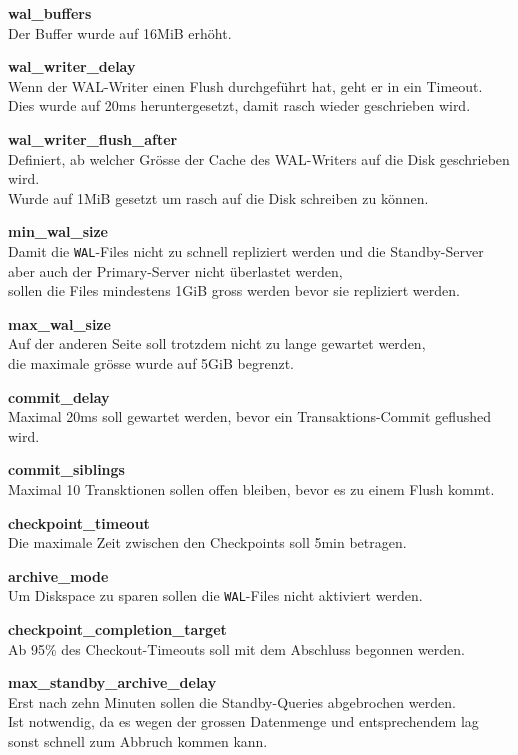 \begin{description}
    \item \textbf{wal\_buffers}\hfill \\Der Buffer wurde auf 16MiB erhöht.
    \item \textbf{wal\_writer\_delay}\hfill \\Wenn der WAL-Writer einen Flush durchgeführt hat, geht er in ein Timeout.\\Dies wurde auf 20ms heruntergesetzt, damit rasch wieder geschrieben wird.
    \item \textbf{wal\_writer\_flush\_after}\hfill \\Definiert, ab welcher Grösse der Cache des WAL-Writers auf die Disk geschrieben wird.\\Wurde auf 1MiB gesetzt um rasch auf die Disk schreiben zu können.
    \item \textbf{min\_wal\_size}\hfill \\Damit die \texttt{WAL}-Files nicht zu schnell repliziert werden und die Standby-Server aber auch der Primary-Server nicht überlastet werden,\\sollen die Files mindestens 1GiB gross werden bevor sie repliziert werden.
    \item \textbf{max\_wal\_size}\hfill \\Auf der anderen Seite soll trotzdem nicht zu lange gewartet werden,\\die maximale grösse wurde auf 5GiB begrenzt.
    \item \textbf{commit\_delay}\hfill \\Maximal 20ms soll gewartet werden, bevor ein Transaktions-Commit geflushed wird.
    \item \textbf{commit\_siblings}\hfill \\Maximal 10 Transktionen sollen offen bleiben, bevor es zu einem Flush kommt.
    \item \textbf{checkpoint\_timeout}\hfill \\Die maximale Zeit zwischen den Checkpoints soll 5min betragen.
    \item \textbf{archive\_mode}\hfill \\Um Diskspace zu sparen sollen die \texttt{WAL}-Files nicht aktiviert werden.
    \item \textbf{checkpoint\_completion\_target}\hfill \\Ab 95\% des Checkout-Timeouts soll mit dem Abschluss begonnen werden.
    \item \textbf{max\_standby\_archive\_delay}\hfill \\Erst nach zehn Minuten sollen die Standby-Queries abgebrochen werden.\\Ist notwendig, da es wegen der grossen Datenmenge und entsprechendem lag sonst schnell zum Abbruch kommen kann.

\end{description}

